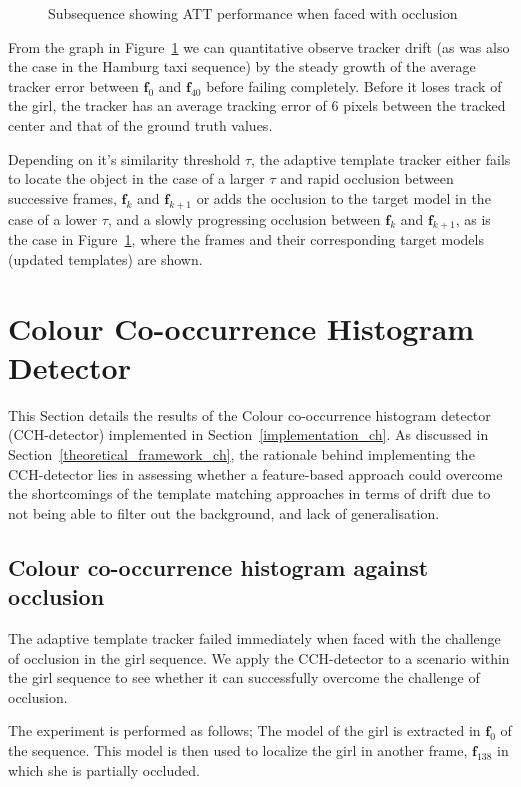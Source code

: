 \begin{figure}
{\begin{tabular}{cccc}
        \end{tabular}}
    \caption{Subsequence showing ATT performance when faced with occlusion\label{fig:adaptive_template_occlusion}}
\end{figure}

From the graph in Figure~\ref{fig:adaptive_template_occlusion} we can
quantitative observe tracker drift (as was also the case in the Hamburg taxi
sequence) by the steady growth of the average tracker error between
$\mathbf{f}_0$ and $\mathbf{f}_{40}$ before failing completely.
Before it loses track of the girl, the tracker has an average tracking error of
6 pixels between the tracked center and that of the ground truth values.

Depending on it's similarity threshold $\tau$, the adaptive template tracker
either fails to locate the object in the case of a larger $\tau$ and rapid
occlusion between successive frames, $\mathbf{f}_k$ and $\mathbf{f}_{k+1}$ or
adds the occlusion to the target model in the case of a lower $\tau$, and a
slowly progressing occlusion between $\mathbf{f}_k$ and $\mathbf{f}_{k+1}$, as
is the case in Figure~\ref{fig:adaptive_template_occlusion}, where the frames
and their corresponding target models (updated templates) are shown. 

\section{Colour Co-occurrence Histogram Detector}
This Section details the results of the Colour co-occurrence histogram detector
(CCH-detector) implemented in Section~\ref{implementation_ch}.
As discussed in Section~\ref{theoretical_framework_ch}, the rationale behind
implementing the CCH-detector lies in assessing whether a feature-based approach could overcome the
shortcomings of the template matching approaches in terms of drift due to not
being able to filter out the background, and lack of generalisation.

\subsection{Colour co-occurrence histogram against occlusion}
The adaptive template tracker failed immediately when faced with the challenge
of occlusion in the girl sequence. We apply the CCH-detector to a scenario within
the girl sequence to see whether it can successfully overcome the challenge of
occlusion.

The experiment is performed as follows; The model of the girl is extracted in
$\mathbf{f}_0$ of the sequence. This model is then used to localize
the girl in another frame, $\mathbf{f}_{138}$ in which she is partially
occluded.

